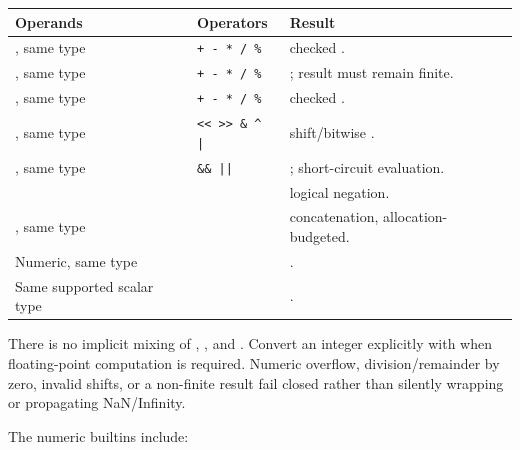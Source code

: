 \begin{center}
\begin{tabularx}{\textwidth}{@{}l l Y@{}}
\toprule
\textbf{Operands} & \textbf{Operators} & \textbf{Result} \\
\midrule
{}, same type & \texttt{+ - * / \%} & checked . \\
, same type & \texttt{+ - * / \%} & ; result must remain finite. \\
, same type & \texttt{+ - * / \%} & checked . \\
, same type & \texttt{<< >> \& \textasciicircum{} |} & shift/bitwise . \\
, same type & \texttt{\&\& ||} & ; short-circuit evaluation. \\
 & \code{!} & logical negation. \\
, same type & \code{+} &  concatenation, allocation-budgeted. \\
Numeric, same type & \code{< <= > >=} & . \\
Same supported scalar type & \code{== !=} & . \\
\bottomrule
\end{tabularx}
\end{center}

There is no implicit mixing of , , and . Convert an integer explicitly with  when floating-point computation is required. Numeric overflow, division/remainder by zero, invalid shifts, or a non-finite  result fail closed rather than silently wrapping or propagating NaN/Infinity.

The numeric builtins include:

